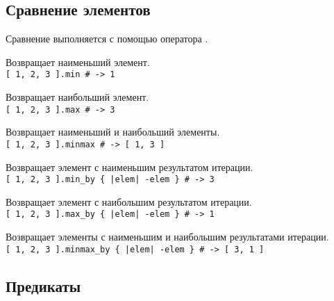\subsection*{Сравнение элементов}

Сравнение выполняется с помощью оператора \method{<=>}.

\begin{methodlist}
  Возвращает наименьший элемент.
  \\\verb![ 1, 2, 3 ].min # -> 1!
  
  Возвращает наибольший элемент. 
  \\\verb![ 1, 2, 3 ].max # -> 3!
  
  Возвращает наименьший и наибольший элементы.
  \\\verb![ 1, 2, 3 ].minmax # -> [ 1, 3 ]!
  
  Возвращает элемент с наименьшим результатом итерации.
  \\\verb![ 1, 2, 3 ].min_by { |elem| -elem } # -> 3!
  
  Возвращает элемент с наибольшим результатом итерации.
  \\\verb![ 1, 2, 3 ].max_by { |elem| -elem } # -> 1!
  
  Возвращает элементы с наименьшим и наибольшим результатами итерации.  
  \\\verb![ 1, 2, 3 ].minmax_by { |elem| -elem } # -> [ 3, 1 ]!
\end{methodlist}

\subsection*{Предикаты}

